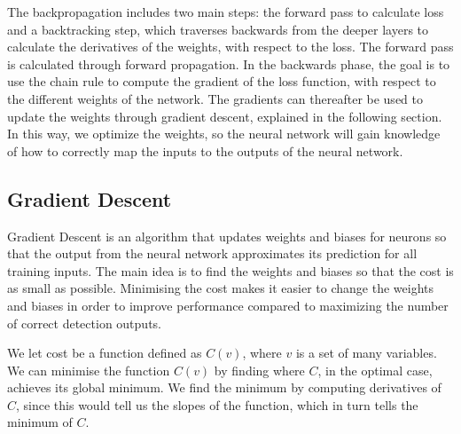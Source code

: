 
The backpropagation includes two main steps: the forward pass to calculate loss and a backtracking step, which traverses backwards from the deeper layers to calculate the derivatives of the weights, with respect to the loss. The forward pass is calculated through forward propagation.
In the backwards phase, the goal is to use the chain rule to compute the gradient of the loss function, with respect to the different weights of the network. The gradients can thereafter be used to update the weights through gradient descent, explained in the following section. In this way, we optimize the weights, so the neural network will gain knowledge of how to correctly map the inputs to the outputs of the neural network.\cite{nnadl}

\subsection{Gradient Descent}
Gradient Descent is an algorithm that updates weights and biases for neurons so that the output from the neural network approximates its prediction for all training inputs. The main idea is to find the weights and biases so that the cost is as small as possible. Minimising the cost makes it easier to change the weights and biases in order to improve performance compared to maximizing the number of correct detection outputs.\cite{ann}

We let cost be a function defined as $C(v)$, where $v$ is a set of many variables. We can minimise the function $C(v)$ by finding where $C$, in the optimal case, achieves its global minimum. We find the minimum by computing derivatives of $C$, since this would tell us the slopes of the function, which in turn tells the minimum of $C$.\cite{ann}